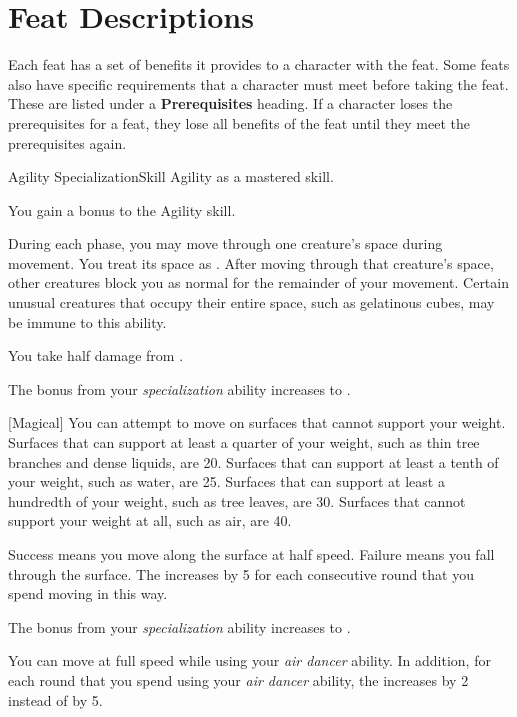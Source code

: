     \section{Feat Descriptions}
        Each feat has a set of benefits it provides to a character with the feat.
        Some feats also have specific requirements that a character must meet before taking the feat.
        These are listed under a \textbf{Prerequisites} heading.
        If a character loses the prerequisites for a feat, they lose all benefits of the feat until they meet the prerequisites again.

    \begin{feat}{Agility Specialization}{Skill}
        \featpre Agility as a mastered skill.

         You gain a  bonus to the Agility skill.

         During each phase, you may move through one creature's space during movement.
        You treat its space as .
        After moving through that creature's space, other creatures block you as normal for the remainder of your movement.
        Certain unusual creatures that occupy their entire space, such as gelatinous cubes, may be immune to this ability.

         You take half damage from .

         The bonus from your \textit{specialization} ability increases to .

        [Magical] You can attempt to move on surfaces that cannot support your weight.
        Surfaces that can support at least a quarter of your weight, such as thin tree branches and dense liquids, are  20.
        Surfaces that can support at least a tenth of your weight, such as water, are  25.
        Surfaces that can support at least a hundredth of your weight, such as tree leaves, are  30.
        Surfaces that cannot support your weight at all, such as air, are  40.

        Success means you move along the surface at half speed.
        Failure means you fall through the surface.
        The  increases by 5 for each consecutive round that you spend moving in this way.

         The bonus from your \textit{specialization} ability increases to .

         You can move at full speed while using your \textit{air dancer} ability.
        In addition, for each round that you spend using your \textit{air dancer} ability, the  increases by 2 instead of by 5.
    \end{feat}

